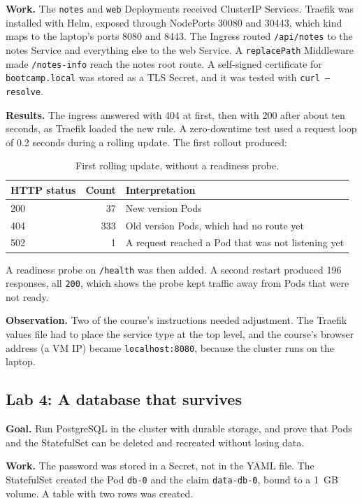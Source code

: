 \documentclass[11pt,a4paper]{article}
\begin{document}
\textbf{Work.} The \texttt{notes} and \texttt{web} Deployments received ClusterIP Services. Traefik was installed with Helm, exposed through NodePorts 30080 and 30443, which kind maps to the laptop's ports 8080 and 8443. The Ingress routed \texttt{/api/notes} to the notes Service and everything else to the web Service. A \texttt{replacePath} Middleware made \texttt{/notes-info} reach the notes root route. A self-signed certificate for \texttt{bootcamp.local} was stored as a TLS Secret, and it was tested with \texttt{curl --resolve}.

\textbf{Results.} The ingress answered with 404 at first, then with 200 after about ten seconds, as Traefik loaded the new rule. A zero-downtime test used a request loop of 0.2 seconds during a rolling update. The first rollout produced:

\begin{table}[H]
\centering
\begin{tabular}{@{}lrl@{}}
\toprule
HTTP status & Count & Interpretation \\
\midrule
200 & 37 & New version Pods \\
404 & 333 & Old version Pods, which had no route yet \\
502 & 1 & A request reached a Pod that was not listening yet \\
\bottomrule
\end{tabular}
\caption{First rolling update, without a readiness probe.}
\end{table}

A readiness probe on \texttt{/health} was then added. A second restart produced 196 responses, all \texttt{200}, which shows the probe kept traffic away from Pods that were not ready.

\textbf{Observation.} Two of the course's instructions needed adjustment. The Traefik values file had to place the service type at the top level, and the course's browser address (a VM IP) became \texttt{localhost:8080}, because the cluster runs on the laptop.

\subsection{Lab 4: A database that survives}
\textbf{Goal.} Run PostgreSQL in the cluster with durable storage, and prove that Pods and the StatefulSet can be deleted and recreated without losing data.

\textbf{Work.} The password was stored in a Secret, not in the YAML file. The StatefulSet created the Pod \texttt{db-0} and the claim \texttt{data-db-0}, bound to a 1~GB volume. A table with two rows was created.
\end{document}
